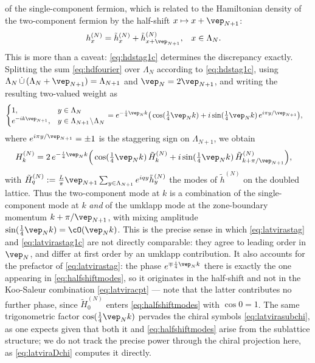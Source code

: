 \documentclass[a4paper, 11pt]{article}
\DeclareMathOperator{\1}{\mathds{1}}
\begin{document}
of the single-component fermion, which is related to the Hamiltonian density of the two-component fermion by the half-shift $x\mapsto x+\vep_{N+1}$:
\begin{align}
\label{eq:hdstag1c}
h^{(N)}_{x} & = \tilde{h}^{(N)}_{x} + \tilde{h}^{(N)}_{x+\vep_{N+1}}, & x & \in\Lambda_{N}.
\end{align}
This is more than a caveat: \eqref{eq:hdstag1c} determines the discrepancy exactly. Splitting the sum \eqref{eq:hdfourier} over $\Lambda_{N}$ according to \eqref{eq:hdstag1c}, using $\Lambda_{N}\!\ \dot\cup\!\ (\Lambda_{N}+\vep_{N+1}) = \Lambda_{N+1}$ and $\vep_{N}=2\vep_{N+1}$, and writing the resulting two-valued weight as
\begin{align*}
\begin{cases} 1, & y\in\Lambda_{N} \\ e^{-ik\vep_{N+1}}, & y\in\Lambda_{N+1}\!\setminus\!\Lambda_{N}\end{cases} & = e^{-\frac{i}{4}\vep_{N}k}\big(\cos(\tfrac{1}{4}\vep_{N}k)+i\sin(\tfrac{1}{4}\vep_{N}k)\!\ e^{i\pi y/\vep_{N+1}}\big),
\end{align*}
where $e^{i\pi y/\vep_{N+1}} = \pm1$ is the staggering sign on $\Lambda_{N+1}$, we obtain
\begin{align}
\label{eq:halfshiftmodes}
H^{(N)}_{k} & = 2\!\ e^{-\frac{i}{4}\vep_{N}k}\Big(\cos(\tfrac{1}{4}\vep_{N}k)\!\ \tilde{H}^{(N)}_{k}+i\sin(\tfrac{1}{4}\vep_{N}k)\!\ \tilde{H}^{(N)}_{k+\pi/\vep_{N+1}}\Big),
\end{align}
with $\tilde{H}^{(N)}_{q} := \tfrac{L}{\pi}\vep_{N+1}\sum_{y\in\Lambda_{N+1}}e^{iqy}\tilde{h}^{(N)}_{y}$ the modes of $\tilde{h}^{(N)}$ on the doubled lattice. Thus the two-component mode at $k$ is a combination of the single-component mode at $k$ \emph{and} of the umklapp mode at the zone-boundary momentum $k+\pi/\vep_{N+1}$, with mixing amplitude $\sin(\tfrac{1}{4}\vep_{N}k) = \cO(\vep_{N}k)$. This is the precise sense in which \eqref{eq:latvirastag} and \eqref{eq:latvirastag1c} are not directly comparable: they agree to leading order in $\vep_{N}$, and differ at first order by an umklapp contribution. It also accounts for the prefactor of \eqref{eq:latvirastag}: the phase $e^{\mp\frac{i}{4}\vep_{N}k}$ there is exactly the one appearing in \eqref{eq:halfshiftmodes}, so it originates in the half-shift and not in the Koo-Saleur combination \eqref{eq:latviracpt} --- note that the latter contributes no further phase, since $\tilde{H}^{(N)}_{0}$ enters \eqref{eq:halfshiftmodes} with $\cos0=1$. The same trigonometric factor $\cos(\tfrac{1}{4}\vep_{N}k)$ pervades the chiral symbols \eqref{eq:latvirasubchi}, as one expects given that both it and \eqref{eq:halfshiftmodes} arise from the sublattice structure; we do not track the precise power through the chiral projection here, as \eqref{eq:latviraDchi} computes it directly.
\end{document}
